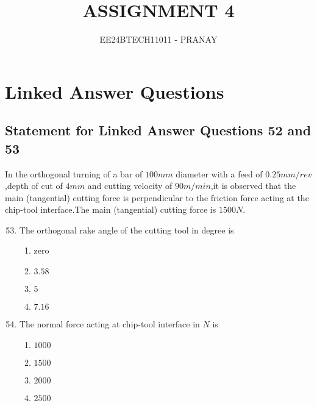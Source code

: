 \documentclass[journal,12pt,onecolumn]{IEEEtran}
\theoremstyle{remark}
\begin{document}

\vspace{3cm}

\title{ASSIGNMENT 4}
\author{EE24BTECH11011 - PRANAY}
\maketitle

\bigskip

\renewcommand{\thefigure}{\theenumi}
\renewcommand{\thetable}{\theenumi}
   \section{\textbf{Linked Answer Questions}}
   \subsection{\textbf{Statement for Linked Answer Questions 52 and 53}}
   In the orthogonal turning of a bar of $100 mm$ diameter with a feed of $0.25 mm/rev$,depth of cut of $4 mm$ and cutting velocity of $90 m/min$,it is observed that the main (tangential) cutting force is perpendicular to the friction force acting at the chip-tool interface.The main (tangential) cutting force is $1500 N$.\\
\begin{enumerate}\setcounter{enumi}{52}
   \item The orthogonal rake angle of the cutting tool in degree is
   \begin{multicols}{4}
   \begin{enumerate}
       \item zero
       \item $3.58$
       \item $5$
       \item $7.16$
   \end{enumerate}
   \end{multicols}
   \item The normal force acting at chip-tool interface in $N$ is
   \begin{multicols}{4}
       \begin{enumerate}
           \item $1000$
           \item $1500$
           \item $2000$
           \item $2500$
       \end{enumerate}
   \end{multicols}
\end{enumerate}
\end{document}
